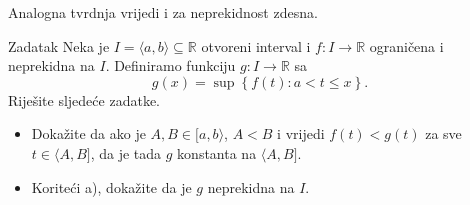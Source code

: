 \begin{remark}
Analogna tvrdnja vrijedi i za neprekidnost zdesna.
\end{remark}
\begin{exercise}{Zadatak}
Neka je $I=\langle a, b\rangle\subseteq \mathbb{R}$ otvoreni interval i $f : I\to \mathbb{R}$ ograničena i neprekidna na $I$. Definiramo funkciju $g : I\to \mathbb{R}$ sa
$$g(x)=\sup\left\{f(t) : a<t\leq x\right\}.$$
Riješite sljedeće zadatke.
\begin{itemize}
\item[a)] Dokažite da ako je $A, B\in [a, b\rangle$, $A<B$ i vrijedi $f(t)< g(t)$ za sve $t\in \langle A, B]$, da je tada $g$ konstanta na $\langle A, B]$.
\item[b)] Koriteći a), dokažite da je $g$ neprekidna na $I$.
\end{itemize}
\end{exercise}
